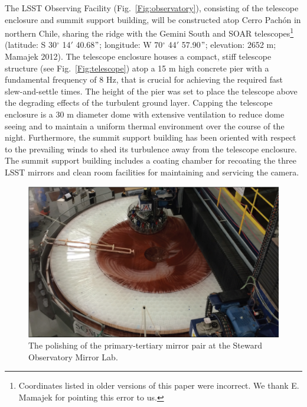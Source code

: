 \documentclass{emulateapj}
\begin{document}
The LSST Observing Facility (Fig.~\ref{Fig:observatory}),
consisting of the telescope enclosure and summit support building, will be constructed atop Cerro Pach\'{o}n in northern Chile,
sharing the ridge with the Gemini South and SOAR telescopes\footnote{Coordinates listed in older versions 
of this paper were incorrect. We thank E. Mamajek for pointing this error to us.} 
(latitude: S 30$^\circ$ 14$'$ 40.68$"$; longitude: W 70$^\circ$ 44$'$ 57.90$"$; elevation: 2652 m; 
Mamajek 2012).  The telescope enclosure houses a compact, stiff
telescope structure (see Fig.~\ref{Fig:telescope}) atop a 15 m high concrete pier
with a fundamental frequency of 8 Hz, that is crucial for achieving the required fast slew-and-settle times.  The height of the pier was set to place the telescope above the degrading 
effects of the turbulent ground layer.  Capping the telescope
enclosure is a 30 m diameter dome with extensive ventilation to reduce
dome seeing 
and to maintain a uniform thermal environment over the course of the night.  Furthermore, the summit support 
building has been oriented with respect to the prevailing winds to shed its turbulence away from the
telescope enclosure.  The summit support building includes a coating chamber for recoating the three LSST mirrors and 
clean room facilities for maintaining and servicing the camera.

\begin{figure}
\includegraphics[width=1.0\hsize,clip]{polishing.pdf}
\caption{The polishing of the primary-tertiary mirror pair at the Steward Observatory Mirror Lab.} 
\label{Fig:polishing}
\end{figure}
\end{document}
